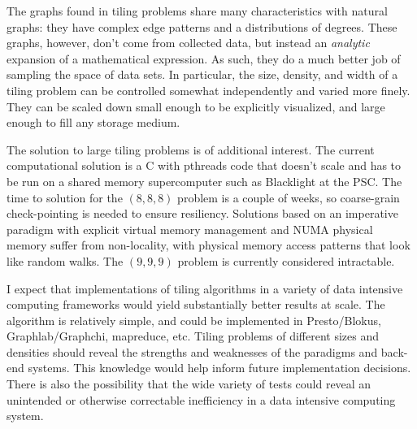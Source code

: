 \documentclass{article}
\begin{document}
The graphs found in tiling problems share many characteristics with natural graphs: they have complex edge patterns and a distributions of degrees.  These graphs, however, don't come from collected data, but instead an \textit{analytic} expansion of a mathematical expression.  As such, they do a much better job of sampling the space of data sets.  In particular, the size, density, and width of a tiling problem can be controlled somewhat independently and varied more finely.  They can be scaled down small enough to be explicitly visualized, and large enough to fill any storage medium.  

The solution to large tiling problems is of additional interest. The current computational solution is a C with pthreads code that doesn't scale and has to be run on a shared memory supercomputer such as Blacklight at the PSC.  The time to solution for the $(8,8,8)$ problem is a couple of weeks, so coarse-grain check-pointing is needed to ensure resiliency.  Solutions based on an imperative paradigm with explicit virtual memory management and NUMA physical memory suffer from non-locality, with physical memory access patterns that look like random walks.  The $(9,9,9)$ problem is currently considered intractable.

I expect that implementations of tiling algorithms in a variety of data intensive computing frameworks would yield substantially better results at scale.  The algorithm is relatively simple, and could be implemented in Presto/Blokus, Graphlab/Graphchi, mapreduce, etc.  Tiling problems of different sizes and densities should reveal the strengths and weaknesses of the paradigms and back-end systems.  This knowledge would help inform future implementation decisions.  There is also the possibility that the wide variety of tests could reveal an unintended or otherwise correctable inefficiency in a data intensive computing system.

 

\end{document}
